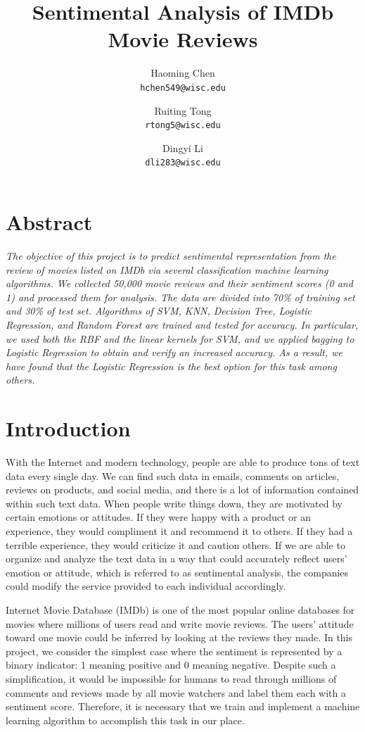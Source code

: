 \documentclass[10pt,twocolumn,letterpage]{article}
\begin{document}
	\title{\textbf{Sentimental Analysis of IMDb Movie Reviews}}
	\author{Haoming Chen\\
		{\tt\small hchen549@wisc.edu}
		\and
		Ruiting Tong\\
		{\tt\small rtong5@wisc.edu}
		\and
		Dingyi Li\\
		{\tt\small dli283@wisc.edu}
	}
	\date{}
	\maketitle

		\section*{Abstract} 
			\textit{The objective of this project is to predict sentimental representation from the review of movies listed on IMDb via several classification machine learning algorithms. We collected 50,000 movie reviews and their sentiment scores (0 and 1) and processed them for analysis. The data are divided into 70\% of training set and 30\% of test set. Algorithms of SVM, KNN, Decision Tree, Logistic Regression, and Random Forest are trained and tested for accuracy. In particular, we used both the RBF and the linear kernels for SVM, and we applied bagging to Logistic Regression to obtain and verify an increased accuracy. As a result, we have found that the Logistic Regression is the best option for this task among others.} 			

		\section{Introduction} 
			 With the Internet and modern technology, people are able to produce tons of text data every single day. We can find such data in emails, comments on articles, reviews on products, and social media, and there is a lot of information contained within such text data. When people write things down, they are motivated by certain emotions or attitudes. If they were happy with a product or an experience, they would compliment it and recommend it to others. If they had a terrible experience, they would criticize it and caution others. If we are able to organize and analyze the text data in a way that could accurately reflect users’ emotion or attitude, which is referred to as sentimental analysis, the companies could modify the service provided to each individual accordingly.
			 
			 Internet Movie Database (IMDb) is one of the most popular online databases for movies where millions of users read and write movie reviews. The users’ attitude toward one movie could be inferred by looking at the reviews they made. In this project, we consider the simplest case where the sentiment is represented by a binary indicator: 1 meaning positive and 0 meaning negative. Despite such a simplification, it would be impossible for humans to read through millions of comments and reviews made by all movie watchers and label them each with a sentiment score. Therefore, it is necessary that we train and implement a machine learning algorithm to accomplish this task in our place. 
			 
\end{document}
